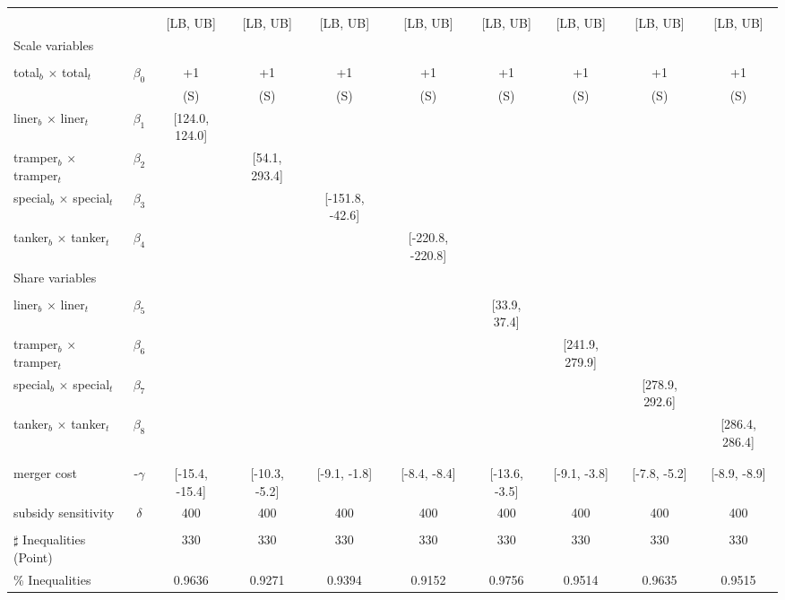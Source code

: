 \begin{tabular}{@{\extracolsep{5pt}}lccccccccc}
\toprule 
 &  &  &  &  &  &  &  &  &  \\
 &  & [LB, UB] & [LB, UB] & [LB, UB] & [LB, UB] & [LB, UB] & [LB, UB] & [LB, UB] & [LB, UB] \\
\midrule 
Scale variables &  &  &  &  &  &  &  \\
 &  &  &  &  &  &  &  &  \\
total$_{b}$ $\times$ total$_{t}$ & $\beta_0$ & +1 & +1 & +1 & +1 & +1 & +1 & +1 & +1 \\
 &  & (S) & (S) & (S) & (S) & (S) & (S) & (S) & (S) \\
liner$_{b}$ $\times$ liner$_{t}$ & $\beta_1$ & [124.0, 124.0] &  &  &  &  &  &  &  \\
tramper$_{b}$ $\times$ tramper$_{t}$ & $\beta_2$ &  & [54.1, 293.4] &  &  &  &  &  &  \\
special$_{b}$ $\times$ special$_{t}$ & $\beta_3$ &  &  & [-151.8, -42.6] &  &  &  &  &  \\
tanker$_{b}$ $\times$ tanker$_{t}$ & $\beta_4$ &  &  &  & [-220.8, -220.8] &  &  &  &  \\
Share variables &  &  &  &  &  &  &  &  &  \\
 &  &  &  &  &  &  &  &  &  \\
liner$_{b}$ $\times$ liner$_{t}$ & $\beta_5$ &  &  &  &  & [33.9, 37.4] &  &  &  \\
tramper$_{b}$ $\times$ tramper$_{t}$ & $\beta_6$ &  &  &  &  &  & [241.9, 279.9] &  &  \\
special$_{b}$ $\times$ special$_{t}$ & $\beta_7$ &  &  &  &  &  &  & [278.9, 292.6] &  \\
tanker$_{b}$ $\times$ tanker$_{t}$ & $\beta_8$ &  &  &  &  &  &  &  & [286.4, 286.4] \\
 &  &  &  &  &  &  &  &  &  \\
 &  &  &  &  &  &  &  &  &  \\
merger cost & -$\gamma$ & [-15.4, -15.4] & [-10.3, -5.2] & [-9.1, -1.8] & [-8.4, -8.4] & [-13.6, -3.5] & [-9.1, -3.8] & [-7.8, -5.2] & [-8.9, -8.9] \\
subsidy sensitivity & $\delta$ & 400 & 400 & 400 & 400 & 400 & 400 & 400 & 400 \\
 &  &  &  &  &  &  &  &  &  \\
\hline 
$\sharp$ Inequalities (Point) &  & 330 & 330 & 330 & 330 & 330 & 330 & 330 & 330 \\
\% Inequalities &  & 0.9636 & 0.9271 & 0.9394 & 0.9152 & 0.9756 & 0.9514 & 0.9635 & 0.9515 \\
\bottomrule 
\end{tabular}
